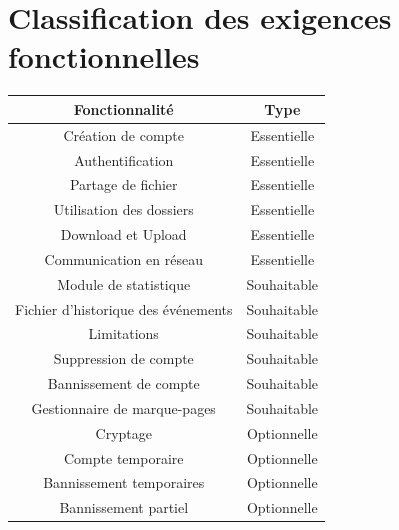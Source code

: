 \documentclass[10pt,a4paper]{report}
\begin{document}
\section{Classification des exigences fonctionnelles}
\bgroup
\def\arraystretch{1.5}
\begin{tabular}{|c|c|}
	\hline
	{\large \textbf{Fonctionnalité}} & {\large \textbf{Type}}\\
	\hline
	Création de compte & Essentielle\\
	\hline
	Authentification & Essentielle\\
	\hline
	Partage de fichier & Essentielle \\
	\hline
	Utilisation des dossiers & Essentielle\\
	\hline
	Download et Upload & Essentielle \\
	\hline
	Communication en réseau & Essentielle \\
	\hline
	Module de statistique & Souhaitable \\
	\hline
	Fichier d'historique des événements & Souhaitable \\
	\hline
	Limitations & Souhaitable\\
	\hline
	Suppression de compte & Souhaitable \\
	\hline
	Bannissement de compte & Souhaitable \\
	\hline
	Gestionnaire de marque-pages & Souhaitable\\
	\hline
	Cryptage & Optionnelle\\
	\hline
	Compte temporaire & Optionnelle \\
	\hline
	Bannissement temporaires & Optionnelle \\
	\hline
	Bannissement partiel & Optionnelle \\
	\hline
\end{tabular}
\egroup
\end{document}
